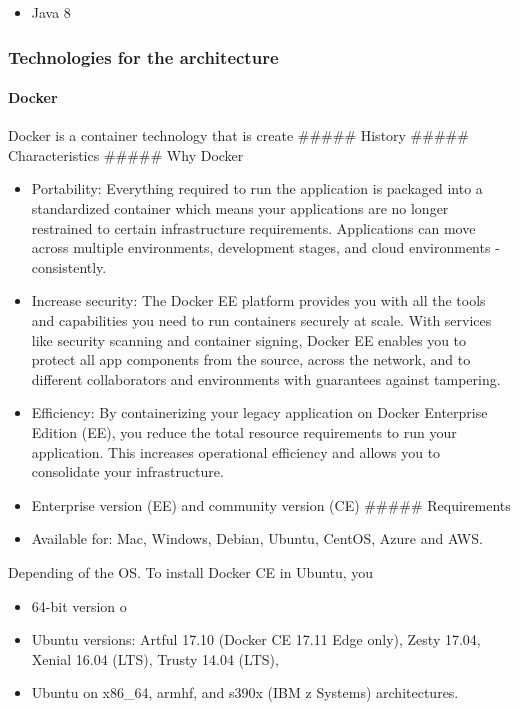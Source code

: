 \documentclass[]{article}
\providecommand{\tightlist}{%
  \setlength{\itemsep}{0pt}\setlength{\parskip}{0pt}}
\let\oldparagraph\paragraph
\renewcommand{\paragraph}[1]{\oldparagraph{#1}\mbox{}}
\begin{document}
\begin{itemize}
\tightlist
\item
  Java 8
\end{itemize}

\hypertarget{technologies-for-the-architecture}{%
\subsubsection{Technologies for the
architecture}\label{technologies-for-the-architecture}}

\hypertarget{docker}{%
\paragraph{Docker}\label{docker}}

Docker is a container technology that is create \#\#\#\#\# History
\#\#\#\#\# Characteristics \#\#\#\#\# Why Docker

\begin{itemize}
\item
  Portability: Everything required to run the application is packaged
  into a standardized container which means your applications are no
  longer restrained to certain infrastructure requirements. Applications
  can move across multiple environments, development stages, and cloud
  environments - consistently.
\item
  Increase security: The Docker EE platform provides you with all the
  tools and capabilities you need to run containers securely at scale.
  With services like security scanning and container signing, Docker EE
  enables you to protect all app components from the source, across the
  network, and to different collaborators and environments with
  guarantees against tampering.
\item
  Efficiency: By containerizing your legacy application on Docker
  Enterprise Edition (EE), you reduce the total resource requirements to
  run your application. This increases operational efficiency and allows
  you to consolidate your infrastructure.
\item
  Enterprise version (EE) and community version (CE) \#\#\#\#\#
  Requirements
\item
  Available for: Mac, Windows, Debian, Ubuntu, CentOS, Azure and AWS.
\end{itemize}

Depending of the OS. To install Docker CE in Ubuntu, you

\begin{itemize}
\tightlist
\item
  64-bit version o
\item
  Ubuntu versions: Artful 17.10 (Docker CE 17.11 Edge only), Zesty
  17.04, Xenial 16.04 (LTS), Trusty 14.04 (LTS),
\item
  Ubuntu on x86\_64, armhf, and s390x (IBM z Systems) architectures.
\end{itemize}
\end{document}

